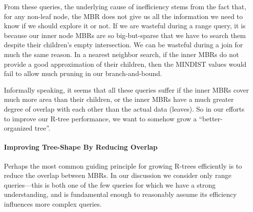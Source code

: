 From these queries, the underlying cause of inefficiency stems from the fact that, for any non-leaf node, the MBR does not give us all the information we need to know if we should explore it or not.
If we are wasteful during a range query, it is because our inner node MBRs are so big-but-sparse that we have to search them despite their children's empty intersection.
We can be wasteful during a join for much the same reason.
In a nearest neighbor search, if the inner MBRs do not provide a good approximation of their children, then the MINDIST values would fail to allow much pruning in our branch-and-bound.

Informally speaking, it seems that all these queries suffer if the inner MBRs cover much more area than their children, or the inner MBRs have a much greater degree of overlap with each other than the actual data (leaves).
So in our efforts to improve our R-tree performance, we want to somehow grow a ``better-organized tree''.





\paragraph{Improving Tree-Shape By Reducing Overlap}
Perhaps the most common guiding principle for growing R-trees efficiently is to reduce the overlap between MBRs.
In our discussion we consider only range queries---this is both one of the few queries for which we have a strong understanding, and is fundamental enough to reasonably assume its efficiency influences more complex queries.

